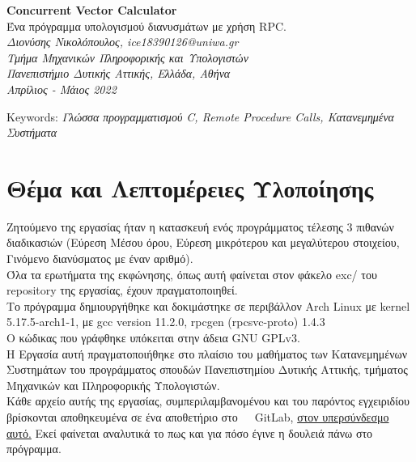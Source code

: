 \thispagestyle{empty}
\begin{center}
    \huge{
        \textbf{
            \color{brown}Concurrent Vector Calculator\color{black}
            \vspace{5mm}
        }
    }\\
    \large{Ένα πρόγραμμα υπολογισμού διανυσμάτων με χρήση RPC.}
    \vspace{5mm}\\
    \small{\emph{
    Διονύσης Νικολόπουλος, ice18390126@uniwa.gr
    \\
    Τμήμα Μηχανικών Πληροφορικής και Υπολογιστών
    \\
    Πανεπιστήμιο Δυτικής Αττικής, Ελλάδα, Αθήνα
    \\
    Απρίλιος - Μάιος 2022
    \\
    }}
    \vspace*{5mm}
\end{center}
\footnotesize
Keywords: \emph{Γλώσσα προγραμματισμού C, Remote Procedure Calls, Κατανεμημένα
Συστήματα}
\normalsize


\section*{Θέμα και Λεπτομέρειες Υλοποίησης}
\begin{addmargin}[2em]{3em}%
\footnotesize{
    Ζητούμενο της εργασίας ήταν η κατασκευή ενός προγράμματος τέλεσης 3 πιθανών
    διαδικασιών (Εύρεση Μέσου όρου, Εύρεση μικρότερου και μεγαλύτερου στοιχείου,
    Γινόμενο διανύσματος με έναν αριθμό).
    \\
    Όλα τα ερωτήματα της εκφώνησης, όπως αυτή φαίνεται στον φάκελο exc/ του
    repository της εργασίας, έχουν πραγματοποιηθεί.
    \\
    Το πρόγραμμα δημιουργήθηκε και δοκιμάστηκε σε περιβάλλον Arch Linux
    με kernel 5.17.5-arch1-1, με gcc version 11.2.0, rpcgen (rpcsvc-proto) 1.4.3
    \\
    Ο κώδικας που γράφθηκε υπόκειται στην άδεια GNU GPLv3.
    \\
    Η Εργασία αυτή πραγματοποιήθηκε στο πλαίσιο του μαθήματος των Κατανεμημένων
    Συστημάτων του προγράμματος σπουδών Πανεπιστημίου Δυτικής Αττικής, τμήματος
    Μηχανικών και Πληροφορικής Υπολογιστών.
    \\
    \color{blue}
    Κάθε αρχείο αυτής της εργασίας, συμπεριλαμβανομένου και του παρόντος
    εγχειριδίου βρίσκονται αποθηκευμένα σε ένα αποθετήριο στο\gitlab{}\ \  \ 
    GitLab,
    \href{https://gitlab.com/nnis/concurrent-vector-calculator}
    {στον υπερσύνδεσμο αυτό.}
    \color{black}
    Εκεί φαίνεται αναλυτικά το πως και για πόσο έγινε η δουλειά πάνω
    στο πρόγραμμα.
}
\end{addmargin}
